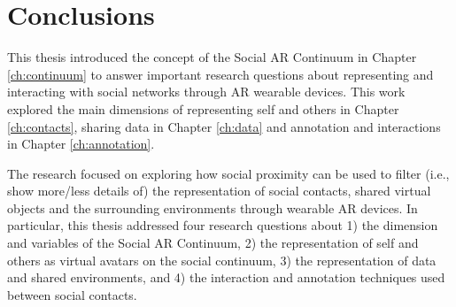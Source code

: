 \chapter{Conclusions}
\label{ch:conclusions}





This thesis introduced the concept of the Social AR Continuum in Chapter \ref{ch:continuum} to answer important research questions about representing and interacting with social networks through AR wearable devices. This work explored the main dimensions of representing self and others in Chapter \ref{ch:contacts}, sharing data in Chapter \ref{ch:data} and annotation and interactions in Chapter \ref{ch:annotation}. 

The research focused on exploring how social proximity can be used to filter (i.e., show more/less details of) the representation of social contacts, shared virtual objects and the surrounding environments through wearable AR devices. In particular, this thesis addressed four research questions about 1) the dimension and variables of the Social AR Continuum, 2) the representation of self and others as virtual avatars on the social continuum, 3) the representation of data and shared environments, and 4) the interaction and annotation techniques used between social contacts.   

